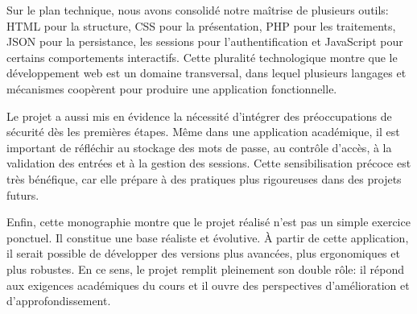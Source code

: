 \documentclass[12pt,a4paper]{article}
\begin{document}
Sur le plan technique, nous avons consolidé notre maîtrise de plusieurs outils: HTML pour la structure, CSS pour la présentation, PHP pour les traitements, JSON pour la persistance, les sessions pour l'authentification et JavaScript pour certains comportements interactifs. Cette pluralité technologique montre que le développement web est un domaine transversal, dans lequel plusieurs langages et mécanismes coopèrent pour produire une application fonctionnelle.

Le projet a aussi mis en évidence la nécessité d'intégrer des préoccupations de sécurité dès les premières étapes. Même dans une application académique, il est important de réfléchir au stockage des mots de passe, au contrôle d'accès, à la validation des entrées et à la gestion des sessions. Cette sensibilisation précoce est très bénéfique, car elle prépare à des pratiques plus rigoureuses dans des projets futurs.

Enfin, cette monographie montre que le projet réalisé n'est pas un simple exercice ponctuel. Il constitue une base réaliste et évolutive. À partir de cette application, il serait possible de développer des versions plus avancées, plus ergonomiques et plus robustes. En ce sens, le projet remplit pleinement son double rôle: il répond aux exigences académiques du cours et il ouvre des perspectives d'amélioration et d'approfondissement.
\end{document}
